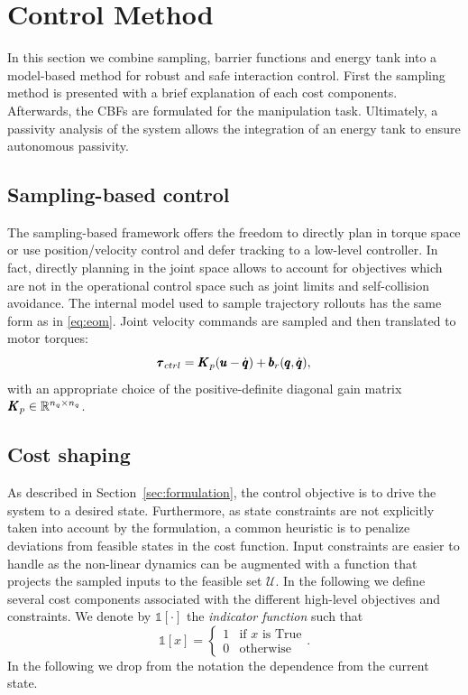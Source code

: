 \section{Control Method} \label{sec:control_method}

In this section we combine sampling, barrier functions and energy tank into a model-based method for robust and safe interaction control. First the sampling method is presented with a brief explanation of each cost components. Afterwards, the CBFs are formulated for the manipulation task. Ultimately, a passivity analysis of the system allows the integration of an energy tank to ensure autonomous passivity. 

\subsection{Sampling-based control}
The sampling-based framework offers the freedom to directly plan in torque space or use position/velocity control and defer tracking to a low-level controller. In fact, directly planning in the joint space allows to account for objectives which are not in the operational control space such as joint limits and self-collision avoidance. The internal model used to sample trajectory rollouts has the same form as in \eqn \ref{eq:eom}. Joint velocity commands are sampled and then translated to motor torques:
\begin{equation}
    \pmb{\tau}_{ctrl} = \pmb{K}_{p} (\pmb{u} - \dot{\pmb{q}}) + \pmb{b}_{r}(\pmb{q}, \dot{\pmb{q}}),
\end{equation}
with an appropriate choice of the positive-definite diagonal gain matrix $\pmb{K}_{p} \in \mathbb{R}^{n_q\times n_q}$. 

\subsection{Cost shaping}
As described in Section~\ref{sec:formulation}, the control objective is to drive the system to a desired state. Furthermore, as state constraints are not explicitly taken into account by the formulation, a common heuristic is to penalize deviations from feasible states in the cost function. Input constraints are easier to handle as the non-linear dynamics can be augmented with a function that projects the sampled inputs to the feasible set $\mathcal{U}$. In the following we define several cost components associated with the different high-level objectives and constraints.
We denote by $\mathds{1}[\cdot]$ the \textit{indicator function} such that
\begin{equation}
    \mathds{1}[x] = 
    \begin{cases}
    1 & \text{if } x \text{ is True} \\
    0 & \text{otherwise}
    \end{cases}.
\end{equation}
In the following we drop from the notation the dependence from the current state. 

